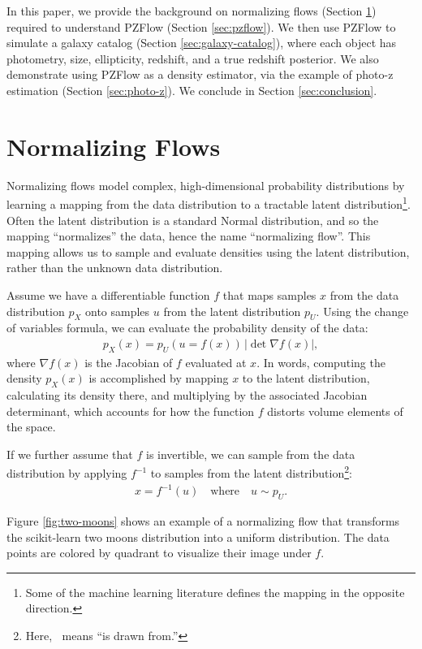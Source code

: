\documentclass[twocolumn,twocolappendix,linenumbers]{aastex631}
\newcommand{\px}{p^{}_{X}}
\newcommand{\pu}{p^{}_{U}}
\begin{document}
In this paper, we provide the background on normalizing flows (Section \ref{sec:nf}) required to understand PZFlow (Section \ref{sec:pzflow}).
We then use PZFlow to simulate a galaxy catalog (Section \ref{sec:galaxy-catalog}), where each object has photometry, size, ellipticity, redshift, and a true redshift posterior.
We also demonstrate using PZFlow as a density estimator, via the example of photo-z estimation (Section \ref{sec:photo-z}).
We conclude in Section \ref{sec:conclusion}.

\section{Normalizing Flows}
\label{sec:nf}

Normalizing flows model complex, high-dimensional probability distributions by learning a mapping from the data distribution to a tractable latent distribution\footnote{Some of the machine learning literature defines the mapping in the opposite direction.}.
Often the latent distribution is a standard Normal distribution, and so the mapping ``normalizes'' the data, hence the name ``normalizing flow''.
This mapping allows us to sample and evaluate densities using the latent distribution, rather than the unknown data distribution.

Assume we have a differentiable function $f$ that maps samples $x$ from the data distribution $\px$ onto samples $u$ from the latent distribution $\pu$.
Using the change of variables formula, we can evaluate the probability density of the data:
\begin{align}
    \px(x) = \pu(u=f(x)) \, |\det \nabla f(x)|,
    \label{eq:px}
\end{align}
where $\nabla f(x)$ is the Jacobian of $f$ evaluated at $x$.
In words, computing the density $\px(x)$ is accomplished by mapping $x$ to the latent distribution, calculating its density there, and multiplying by the associated Jacobian determinant, which accounts for how the function $f$ distorts volume elements of the space.

If we further assume that $f$ is invertible, we can sample from the data distribution by applying $f^{-1}$ to samples from the latent distribution\footnote{Here, $~$ means ``is drawn from.''}:
\begin{align}
    x = f^{-1}(u) \quad \text{where} \quad u \sim \pu.
\end{align}

Figure \ref{fig:two-moons} shows an example of a normalizing flow that transforms the scikit-learn \citep{sklearn} two moons distribution into a uniform distribution.
The data points are colored by quadrant to visualize their image under $f$.
\end{document}
